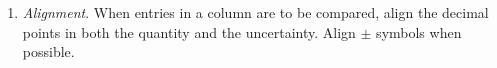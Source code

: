 \documentclass[letterpaper,11pt]{article}
\begin{document}
\begin{enumerate}
\item {\it Alignment\/}. When entries in a column are to be compared, align the decimal points in
both the quantity and the uncertainty. Align $\pm$ symbols when possible. 



%


\end{enumerate}
\end{document}
